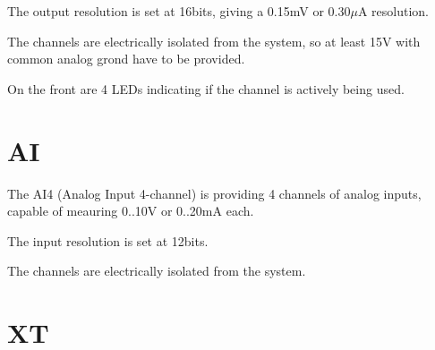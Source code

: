 The output resolution is set at 16bits, giving a 0.15mV or 0.30$\mu$A resolution. 

The channels are electrically isolated from the system, so at least 15V with common analog grond have to be provided.

On the front are 4 LEDs indicating if the channel is actively being used. 


\section{AI}
The AI4 (Analog Input 4-channel) is providing 4 channels of analog inputs, capable of meauring 0..10V or 0..20mA each. 

The input resolution is set at 12bits.

The channels are electrically isolated from the system.


\section{XT}
